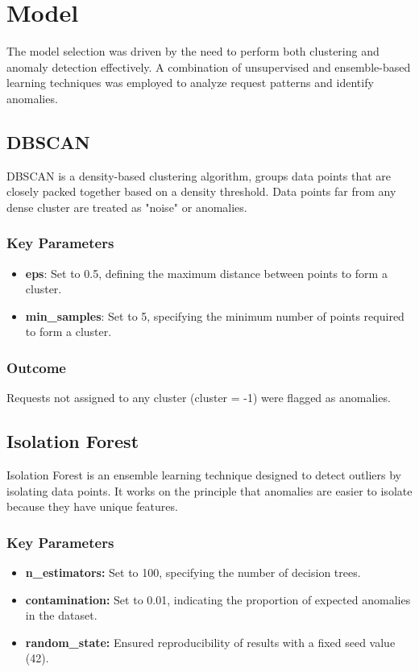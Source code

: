 \section{Model}
The model selection was driven by the need to perform both clustering and anomaly detection effectively. A combination of unsupervised and ensemble-based learning techniques was employed to analyze request patterns and identify anomalies.

\subsection{DBSCAN}
DBSCAN is a density-based clustering algorithm, groups data points that are closely packed together based on a density threshold. Data points far from any dense cluster are treated as "noise" or anomalies.
\subsubsection{Key Parameters}
\begin{itemize}
	\item \textbf{eps}: Set to 0.5, defining the maximum distance between points to form a cluster.
	\item \textbf{min\_samples}: Set to 5, specifying the minimum number of points required to form a cluster.
\end{itemize}
\subsubsection{Outcome}
Requests not assigned to any cluster (cluster = -1) were flagged as anomalies.

\subsection{Isolation Forest}
Isolation Forest is an ensemble learning technique designed to detect outliers by isolating data points. It works on the principle that anomalies are easier to isolate because they have unique features.
\subsubsection{Key Parameters}
\begin{itemize}
	\item \textbf{n\_estimators:} Set to 100, specifying the number of decision trees.
	\item \textbf{contamination:} Set to 0.01, indicating the proportion of expected anomalies in the dataset.
	\item \textbf{random\_state:} Ensured reproducibility of results with a fixed seed value (42).
\end{itemize}
